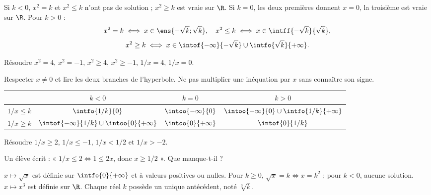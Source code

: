 \begin{keypoint}
Si $k<0$, $x^2=k$ et $x^2\leq k$ n'ont pas de solution ; $x^2\geq k$ est vraie sur $\R$. Si $k=0$, les deux premières donnent $x=0$, la troisième est vraie sur $\R$. Pour $k>0$ :
\[x^2=k\iff x\in\ens{-\sqrt k;\sqrt k},\quad x^2\leq k\iff x\in\intff{-\sqrt k}{\sqrt k},\]
\[x^2\geq k\iff x\in\intof{-\infty}{-\sqrt k}\cup\intfo{\sqrt k}{+\infty}.\]
\end{keypoint}
\begin{example}Résoudre $x^2=4$, $x^2=-1$, $x^2\geq4$, $x^2\geq-1$, $1/x=4$, $1/x=0$.\end{example}
\begin{method}
Respecter $x\ne0$ et lire les deux branches de l'hyperbole. Ne pas multiplier une inéquation par $x$ sans connaître son signe.
\end{method}
\begin{center}\small{}\begin{tabular}{c|c|c|c}
&$k<0$&$k=0$&$k>0$\\\hline
$1/x\leq k$&$\intfo{1/k}{0}$&$\intoo{-\infty}{0}$&$\intoo{-\infty}{0}\cup\intfo{1/k}{+\infty}$\\
$1/x\geq k$&$\intof{-\infty}{1/k}\cup\intoo{0}{+\infty}$&$\intoo{0}{+\infty}$&$\intof{0}{1/k}$
\end{tabular}\end{center}
\begin{example}Résoudre $1/x\geq2$, $1/x\leq-1$, $1/x<1/2$ et $1/x>-2$.\end{example}
\begin{example}Un élève écrit : « $1/x\leq2\iff1\leq2x$, donc $x\geq1/2$ ». Que manque-t-il ?\end{example}
\begin{keypoint}[Définitions]
$x\mapsto\sqrt x$ est définie sur $\intfo{0}{+\infty}$ et à valeurs positives ou nulles. Pour $k\geq0$, $\sqrt x=k\iff x=k^2$ ; pour $k<0$, aucune solution.
$x\mapsto x^3$ est définie sur $\R$. Chaque réel $k$ possède un unique antécédent, noté $\sqrt[3]{k}$.
\end{keypoint}
